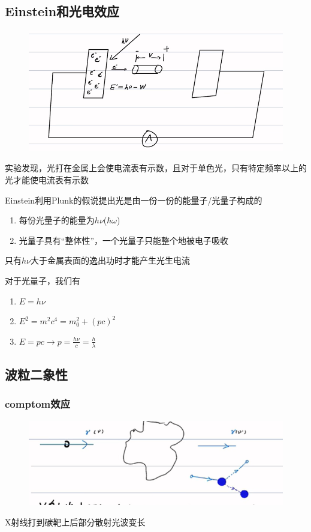 \documentclass[lang=cn,15pt]{elegantbook}
\begin{document}
\subsection{Einstein和光电效应}
\begin{figure}[H]
	\centering
	\includegraphics[width=0.8\linewidth]{figure/screenshot002}
\end{figure}

实验发现，光打在金属上会使电流表有示数，且对于单色光，只有特定频率以上的光才能使电流表有示数

Einstein利用Plunk的假说提出光是由一份一份的能量子/光量子构成的

\begin{enumerate}
	\item 每份光量子的能量为$h\nu$($\hbar\omega$)
	\item 光量子具有“整体性”，一个光量子只能整个地被电子吸收
\end{enumerate}

只有$h\nu$大于金属表面的逸出功时才能产生光生电流

对于光量子，我们有
\begin{enumerate}
	\item $E=h\nu$
	\item $E^2=m^2c^4=m_0^{2}+(pc)^{2}$
	\item $E=pc\rightarrow p=\frac{h\nu}{c}=\frac{h}{\lambda}$
\end{enumerate}
\subsection{波粒二象性}
\subsubsection{comptom效应}
\begin{figure}[H]
	\centering
	\includegraphics[width=0.7\linewidth]{figure/screenshot003}
\end{figure}
X射线打到碳靶上后部分散射光波变长
\end{document}

